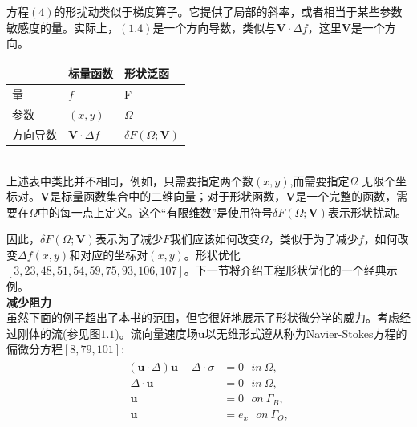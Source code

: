 \documentclass[12pt,a4paper]{article}
\numberwithin{equation}{section}
\begin{document}
方程$(4)$的形扰动类似于梯度算子。它提供了局部的斜率，或者相当于某些参数敏感度的量。实际上，$(1.4)$是一个方向导数，类似与$\mathbf{V} \cdot \Delta f$，这里$\mathbf{V}$是一个方向。
\begin{tabular}{ |l|l|l|}   
\hline   
  &  标量函数 & 形状泛函 \\
\hline
量 & $f$ & F \\
\hline
参数 & $(x,y)$ & $\Omega$ \\
\hline
方向导数 & $\mathbf{V} \cdot \Delta f$ &  $\delta F(\Omega;\mathbf{V})$ \\
\hline
\end{tabular}
\\
上述表中类比并不相同，例如，只需要指定两个数$(x,y)$,而需要指定$\Omega$	无限个坐标对。$\mathbf{V}$是标量函数集合中的二维向量；对于形状函数，$\mathbf{V}$是一个完整的函数，需要在$\Omega$中的每一点上定义。这个“有限维数”是使用符号$\delta F(\Omega;\mathbf{V})$表示形状扰动。

因此，$\delta F(\Omega;\mathbf{V})$表示为了减少$F$我们应该如何改变$\Omega$，类似于为了减少$f$，如何改变$\Delta f(x,y)$和对应的坐标对$(x,y)$。形状优化$[3,23,48,51,54,59,75,93,106,107]$。下一节将介绍工程形状优化的一个经典示例。\\
\textbf{减少阻力}\\
虽然下面的例子超出了本书的范围，但它很好地展示了形状微分学的威力。考虑经过刚体的流(参见图$1.1$)。流向量速度场$\mathbf{u}$以无维形式遵从称为Navier-Stokes方程的偏微分方程$[8,79,101]$:
\begin{gather}
\begin{aligned}
(\mathbf{u}\cdot \Delta)\mathbf{u}-\Delta \cdot \sigma & =  0~~~in~\Omega,\\~\Delta \cdot \mathbf{u} & = 0~~~in~\Omega,\\~\mathbf{u}& =0~~~on~\Gamma _B,\\~\mathbf{u}& = e_x~~~on~\Gamma _O,
\end{aligned}
\end{gather}
\end{document}
